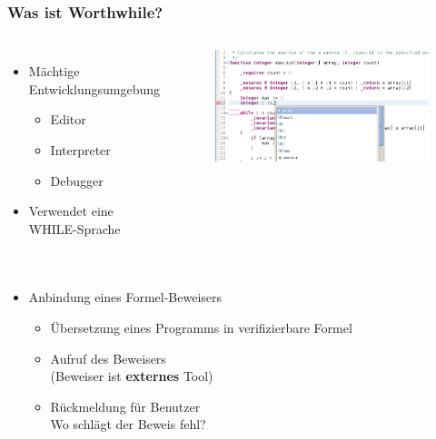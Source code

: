 \documentclass[t,svgnames]{beamer}
\begin{document}
\begin{frame}
	\frametitle{Was ist Worthwhile?}
	
	\begin{columns}[c]
			\begin{itemize}
			\item Mächtige Entwicklungsumgebung
			\begin{itemize}
				\item Editor
				\item Interpreter
				\item Debugger
			\end{itemize}
			\item Verwendet eine WHILE-Sprache
		\end{itemize}	
		
		
			\begin{figure}
				\includegraphics[width=\textwidth]{screenshot1.png}			
			\end{figure}
			
	\end{columns}	

	\pause
	
		\begin{columns}[c]
			\begin{itemize}
			\item Anbindung eines Formel-Beweisers
			\begin{itemize}
				\item Übersetzung eines Programms in verifizierbare Formel
				\item Aufruf des Beweisers  \\ \scriptsize (Beweiser ist \textbf{externes} Tool) 
				\item \normalsize Rückmeldung für Benutzer  \\ \scriptsize  Wo schlägt der Beweis fehl? 
			\end{itemize}
		\end{itemize}	
		

\end{columns}
\end{frame}
\end{document}

